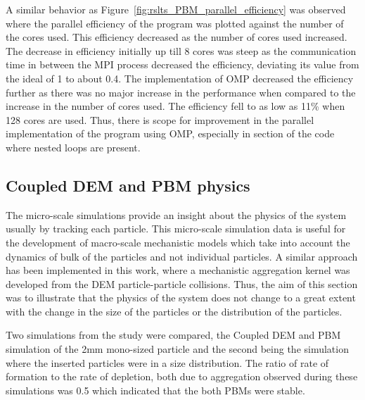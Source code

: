 \documentclass[preprint,11pt,authoryear]{elsarticle}
\begin{document}
A similar behavior as Figure~\ref{fig:rslts_PBM_parallel_efficiency} was observed where the parallel 
efficiency of the program was plotted against the number of the cores used. This efficiency 
decreased as the number of cores used increased. The decrease in efficiency initially up till 8 cores 
was steep as the communication time in between the MPI process decreased the efficiency, deviating 
its value from the ideal of 1 to about 0.4. The implementation of OMP decreased the efficiency further 
as there was no major increase in the performance when compared to the increase in the number 
of cores used. The efficiency fell to as low as 11\% when 128 cores are used. 
Thus, there is scope for improvement in the parallel implementation 
of the program using OMP, especially in section of the code where nested loops are present.


\subsection{Coupled DEM and PBM physics}
The micro-scale simulations provide an insight about the physics of the system usually by tracking 
each particle. This micro-scale simulation data is useful for the development of macro-scale 
mechanistic models which take into account the dynamics of bulk of the particles and not individual 
particles. A similar approach has been implemented in this work, where a mechanistic aggregation 
kernel was developed from the DEM particle-particle collisions. Thus, the aim of this section was to 
illustrate that the physics of the system does not change to a great extent with the change in the size 
of the particles or the distribution of the particles.

Two simulations from the study were compared, the Coupled DEM and PBM simulation of the 2mm 
mono-sized particle and the second being the simulation where the inserted particles were in a size 
distribution. The ratio of rate of formation to the rate of depletion, both due to aggregation 
observed during these simulations was 0.5 which indicated that the both PBMs were stable.
\end{document}
